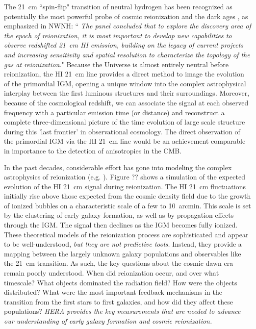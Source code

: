 \documentclass[preprint]{aastex}
\def\HI{{H{\small I }}}
\begin{document}
The 21~cm ``spin-flip" transition of  neutral hydrogen has been recognized as potentially the most powerful probe 
of cosmic reionization and  the dark ages \citep{morales_wyithe2010, furlanetto_et_al2006}, as emphasized in NWNH: 
``{\it 
The panel concluded that  to explore the discovery area of the epoch of reionization, it is most important to 
develop new capabilities to observe redshifted 21~cm \HI emission, building on the legacy of current projects and 
increasing sensitivity and spatial resolution to characterize the topology of the gas at reionization.}"  Because 
the Universe is almost entirely neutral before reionization, the HI 21~cm line provides a direct method to image 
the evolution of the primordial IGM, opening a unique window into the complex astrophysical interplay between the 
first luminous structures and their surroundings. Moreover, because of the cosmological redshift, we can associate 
the signal at each observed frequency with a particular emission time (or distance) and reconstruct a complete 
three-dimensional picture of the time evolution of large scale structure during this 'last frontier' in 
observational cosmology. 
The direct observation of the primordial IGM via the HI 21~cm line would be an achievement comparable in importance 
to the detection of anisotropies in the CMB.

In the past decades, considerable effort has gone into modeling the complex astrophysics of reionization
(e.g. \citealt{shapiro_giroux1987, haiman_loeb1997, furlanetto_et_al2004, santos_et_al2010}). Figure ?? shows a 
simulation of the expected evolution of the HI 21~cm signal during reionization. The HI 21~cm fluctuations initially 
rise above those expected from the cosmic density field due to the growth of ionized bubbles on a characteristic 
scale of a few to 10~arcmin. This scale is set by the clustering of early galaxy formation, as well as by 
propagation effects through the IGM. The signal then declines as the IGM becomes fully ionized.  These theoretical 
models of the reionization process are sophisticated and appear to be well-understood, {\it but they are not 
predictive tools.} Instead, they provide a mapping between the largely unknown galaxy populations and observables 
like the 21~cm transition. As such, the key questions about the cosmic dawn era remain poorly understood.  When 
did reionization occur, and over what timescale?  What objects dominated the radiation field?  How were the 
objects distributed?  What were the most important feedback mechanisms in the transition from the first stars to
first galaxies, and how did they affect these populations?  {\it HERA provides the key measurements that are needed 
to advance our understanding of early galaxy formation and cosmic reionization.}
\end{document}
